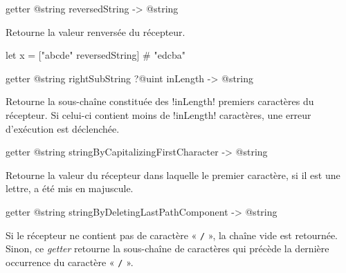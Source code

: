 \begin{galgas3box}
getter @string reversedString -> @string
\end{galgas3box}

Retourne la valeur renversée du récepteur.

\begin{galgas3}
let x = ["abcde" reversedString] # "edcba"
\end{galgas3}









\begin{galgas3box}
getter @string rightSubString ?@uint inLength -> @string
\end{galgas3box}

Retourne la sous-chaîne constituée des \ggst!inLength! premiers caractères du récepteur. Si celui-ci contient moins de \ggst!inLength! caractères, une erreur d'exécution est déclenchée.









\begin{galgas3box}
getter @string stringByCapitalizingFirstCharacter -> @string
\end{galgas3box}

Retourne la valeur du récepteur dans laquelle le premier caractère, si il est une lettre, a été mis en majuscule.









\begin{galgas3box}
getter @string stringByDeletingLastPathComponent -> @string
\end{galgas3box}

Si le récepteur ne contient pas de caractère « \texttt{/} », la chaîne vide est retournée. Sinon, ce \emph{getter} retourne la sous-chaîne de caractères qui précède la dernière occurrence du caractère « \texttt{/} ».









